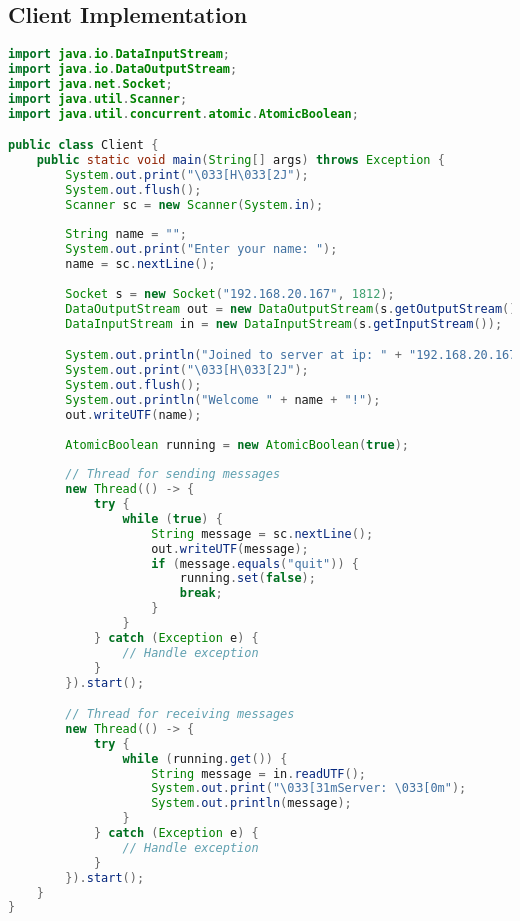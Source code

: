 \documentclass[12pt,a4paper]{article}
\begin{document}
\subsection{Client Implementation}

\begin{lstlisting}[language=Java, caption=Client.java - Main Client Class]
import java.io.DataInputStream;
import java.io.DataOutputStream;
import java.net.Socket;
import java.util.Scanner;
import java.util.concurrent.atomic.AtomicBoolean;

public class Client {
    public static void main(String[] args) throws Exception {
        System.out.print("\033[H\033[2J");
        System.out.flush();
        Scanner sc = new Scanner(System.in);
        
        String name = "";
        System.out.print("Enter your name: ");
        name = sc.nextLine();
        
        Socket s = new Socket("192.168.20.167", 1812);
        DataOutputStream out = new DataOutputStream(s.getOutputStream());
        DataInputStream in = new DataInputStream(s.getInputStream());

        System.out.println("Joined to server at ip: " + "192.168.20.167" + " and port " + "1812 as "+name);
        System.out.print("\033[H\033[2J");
        System.out.flush();
        System.out.println("Welcome " + name + "!");
        out.writeUTF(name);
        
        AtomicBoolean running = new AtomicBoolean(true);
        
        // Thread for sending messages
        new Thread(() -> {
            try {
                while (true) {
                    String message = sc.nextLine();
                    out.writeUTF(message);
                    if (message.equals("quit")) {
                        running.set(false);
                        break;
                    }
                }
            } catch (Exception e) {
                // Handle exception
            }
        }).start();

        // Thread for receiving messages
        new Thread(() -> {
            try {
                while (running.get()) {
                    String message = in.readUTF();
                    System.out.print("\033[31mServer: \033[0m");
                    System.out.println(message);
                }
            } catch (Exception e) {
                // Handle exception
            }
        }).start();
    }
}
\end{lstlisting}
\end{document}
